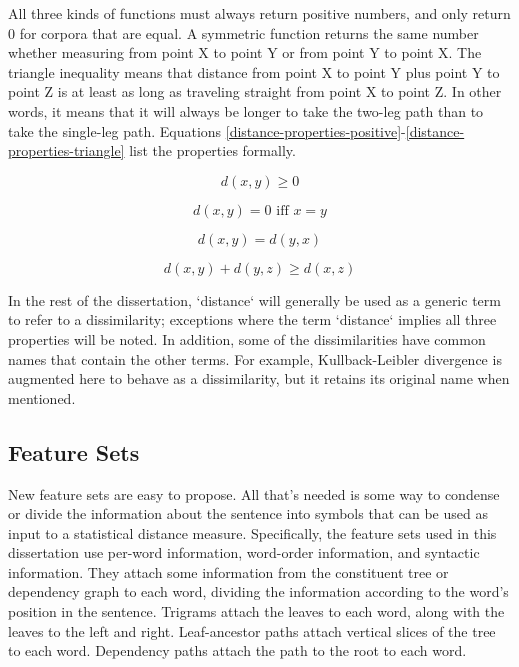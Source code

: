 All three kinds of functions must always return positive numbers, and
only return 0 for corpora that are equal.  A symmetric function
returns the same number whether measuring from point X to point Y or
from point Y to point X. The triangle inequality means that distance
from point X to point Y plus point Y to point Z is at least as long as
traveling straight from point X to point Z.  In other words, it means
that it will always be longer to take the two-leg path than to take
the single-leg path. Equations
\ref{distance-properties-positive}-\ref{distance-properties-triangle}
list the properties formally.

\begin{equation}
  d(x,y) \ge 0
  \label{distance-properties-positive}
\end{equation}

\begin{equation}
 d(x,y) = 0 \textrm{ iff } x=y
\end{equation}

\begin{equation}
  d(x,y) = d(y,x)
\end{equation}

\begin{equation}
  d(x,y) + d(y,z) \ge d(x,z)
\label{distance-properties-triangle}
\end{equation}

In the rest of the dissertation, `distance` will generally be used as
a generic term to refer to a dissimilarity; exceptions where the term `distance`
implies all three properties will be noted. In addition, some of the
dissimilarities have common names that contain the other terms. For
example, Kullback-Leibler divergence is augmented here to behave as a
dissimilarity, but it retains its original name when mentioned.

\subsection{Feature Sets}

New feature sets are easy to propose. All that's needed is some way to
condense or divide the information about the sentence into symbols
that can be used as input to a statistical distance
measure. Specifically, the feature sets used in this dissertation use
per-word information, word-order information, and syntactic
information. They attach some information from the constituent tree or
dependency graph to each word, dividing the information according to
the word's position in the sentence. Trigrams attach the leaves to
each word, along with the leaves to the left and right.
Leaf-ancestor paths attach vertical slices of the tree to each
word. Dependency paths attach the path to the root to each word.


